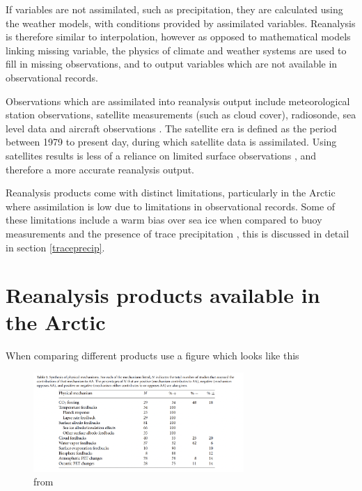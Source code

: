 \documentclass[11pt, oneside]{article}
\begin{document}
If variables are not assimilated, such as precipitation, they are calculated using the weather models, with conditions provided by assimilated variables. Reanalysis is therefore similar to interpolation, however as opposed to mathematical models linking missing variable, the physics of climate and weather systems are used to fill in missing observations, and to output variables which are not available in observational records. 

Observations which are assimilated into reanalysis output include meteorological station observations, satellite measurements (such as cloud cover), radiosonde, sea level data and aircraft observations \cite{gelaro2017modern}. The satellite era is defined as the period between 1979 to present day, during which satellite data is assimilated. Using satellites results is less of a reliance on limited surface observations \cite{knutson2006assessment}, and therefore a more accurate reanalysis output.


Reanalysis products come with distinct limitations, particularly in the Arctic where assimilation is low due to limitations in observational records. Some of these limitations include a warm bias over sea ice when compared to buoy measurements \cite{wang2019comparison} and the presence of trace precipitation \cite{boisvert2018intercomparison}, this is discussed in detail in section \ref{traceprecip}.


\section{Reanalysis products available in the Arctic}

When comparing different products use a figure which looks like this 

\begin{figure}[ht]
    \centering
    \vspace{-4mm}
    \includegraphics[width=80mm]{previdi_comparasion_mechanisms.png}
    \vspace{-4mm}
    \caption{from \cite{previdi2021arctic} }
    \label{f:previdi2021arctic}
\end{figure}
\end{document}
